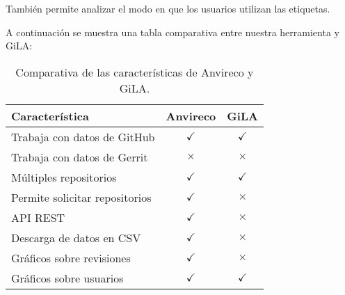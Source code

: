 También permite analizar el modo en que los usuarios utilizan las etiquetas.

A continuación se muestra una tabla comparativa entre nuestra herramienta y GiLA:

\begin{table}[H]
\centering
\begin{tabular}{lcc}
\toprule
Característica & Anvireco & GiLA \\
\midrule
Trabaja con datos de GitHub & \cellcolor{green!25} {$\checkmark$} & \cellcolor{green!25} {$\checkmark$} \\
Trabaja con datos de Gerrit & \cellcolor{red!25} {$\times$} & \cellcolor{red!25} {$\times$} \\
Múltiples repositorios & \cellcolor{green!25} {$\checkmark$} & \cellcolor{green!25} {$\checkmark$} \\
Permite solicitar repositorios & \cellcolor{green!25} {$\checkmark$} & \cellcolor{red!25} {$\times$} \\
API REST & \cellcolor{green!25} {$\checkmark$} & \cellcolor{red!25} {$\times$} \\
Descarga de datos en CSV & \cellcolor{green!25} {$\checkmark$} & \cellcolor{red!25} {$\times$} \\
Gráficos sobre revisiones & \cellcolor{green!25} {$\checkmark$} & \cellcolor{red!25} {$\times$} \\
Gráficos sobre usuarios & \cellcolor{green!25} {$\checkmark$} & \cellcolor{green!25} {$\checkmark$} \\
\bottomrule
\end{tabular}
\caption{Comparativa de las características de Anvireco y GiLA.}
\label{comparativa-anvireco-gila}
\end{table}